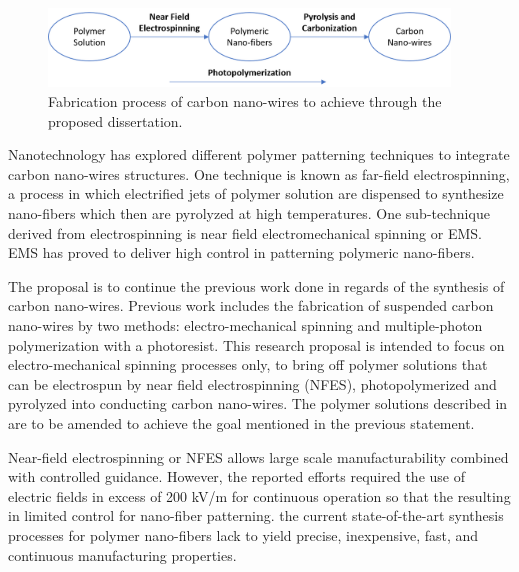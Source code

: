 \begin{figure}[th]
\centering
\includegraphics[width=0.95\textwidth]{./Figures/FabricationProcess.png}
\decoRule
\caption[Fabrication Process]{Fabrication process of carbon nano-wires to achieve through the proposed dissertation.}
\label{fig:fabricationFlowChart}
\end{figure}

Nanotechnology has explored different polymer patterning techniques to integrate carbon nano-wires structures. One technique is known as far-field electrospinning, a process in which electrified jets of polymer solution are dispensed to synthesize nano-fibers which then are pyrolyzed at high temperatures. One sub-technique derived from electrospinning is near field electromechanical spinning or EMS. EMS has proved to deliver high control in patterning polymeric nano-fibers. \cite{Cardenas2017}

The proposal is to continue the previous work done in regards of the synthesis of carbon nano-wires. Previous work includes the fabrication of suspended carbon nano-wires by two methods: electro-mechanical spinning and multiple-photon polymerization with a photoresist. \cite{Cardenas2017} This research proposal is intended to focus on electro-mechanical spinning processes only, to bring off polymer solutions that can be electrospun by near field electrospinning (NFES), photopolymerized and pyrolyzed into conducting carbon nano-wires. The polymer solutions described in \cite{Cardenas2017} are to be amended to achieve the goal mentioned in the previous statement.

Near-field electrospinning or NFES allows large scale manufacturability combined with controlled guidance. \cite{Madou2011} However, the reported efforts required the use of electric fields in excess of 200 kV/m for continuous operation so that the resulting in limited control for nano-fiber patterning. \cite{Madou2011} the current state-of-the-art synthesis processes for polymer nano-fibers lack to yield precise, inexpensive, fast, and continuous manufacturing properties.







